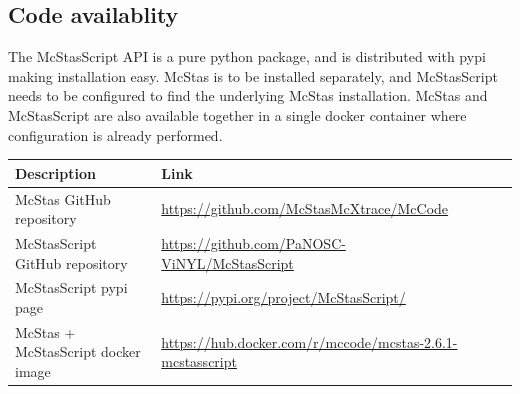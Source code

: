 \documentclass[10pt]{scrartcl}
\begin{document}
\subsection{Code availablity}
The McStasScript API is a pure python package, and is distributed with pypi making installation easy. McStas is to be installed separately, and McStasScript needs to be configured to find the underlying McStas installation. McStas and McStasScript are also available together in a single docker container where configuration is already performed.

\begin{tabular}{|l|l|l|l|}
  \hline
  \textbf{Description} & \textbf{Link} \\
  \hline
  McStas GitHub repository & \url{https://github.com/McStasMcXtrace/McCode} \\
  McStasScript GitHub repository & \url{https://github.com/PaNOSC-ViNYL/McStasScript} \\
  McStasScript pypi page & \url{https://pypi.org/project/McStasScript/} \\
  McStas + McStasScript docker image & \url{https://hub.docker.com/r/mccode/mcstas-2.6.1-mcstasscript} \\  
  \hline
\end{tabular}
\end{document}
